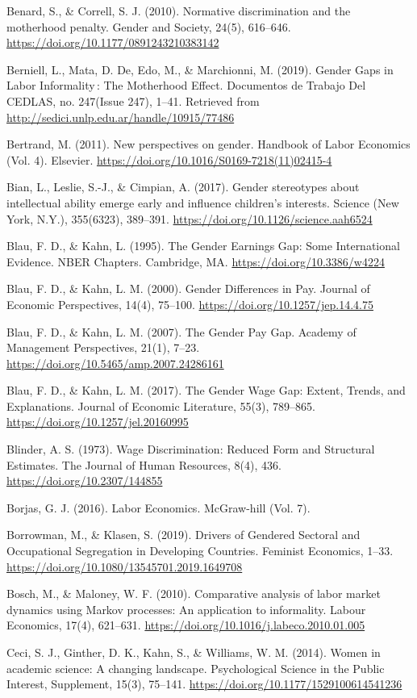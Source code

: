 Benard, S., \& Correll, S. J. (2010). Normative discrimination and the motherhood penalty. Gender and Society, 24(5), 616–646. \url{https://doi.org/10.1177/0891243210383142}

Berniell, L., Mata, D. De, Edo, M., \& Marchionni, M. (2019). Gender Gaps in Labor Informality : The Motherhood Effect. Documentos de Trabajo Del CEDLAS, no. 247(Issue 247), 1–41. Retrieved from \url{http://sedici.unlp.edu.ar/handle/10915/77486}

Bertrand, M. (2011). New perspectives on gender. Handbook of Labor Economics (Vol. 4). Elsevier. \url{https://doi.org/10.1016/S0169-7218(11)02415-4}

Bian, L., Leslie, S.-J., \& Cimpian, A. (2017). Gender stereotypes about intellectual ability emerge early and influence children's interests. Science (New York, N.Y.), 355(6323), 389–391. \url{https://doi.org/10.1126/science.aah6524}

Blau, F. D., \& Kahn, L. (1995). The Gender Earnings Gap: Some International Evidence. NBER Chapters. Cambridge, MA. \url{https://doi.org/10.3386/w4224}

Blau, F. D., \& Kahn, L. M. (2000). Gender Differences in Pay. Journal of Economic Perspectives, 14(4), 75–100. \url{https://doi.org/10.1257/jep.14.4.75}

Blau, F. D., \& Kahn, L. M. (2007). The Gender Pay Gap. Academy of Management Perspectives, 21(1), 7–23. \url{https://doi.org/10.5465/amp.2007.24286161}

Blau, F. D., \& Kahn, L. M. (2017). The Gender Wage Gap: Extent, Trends, and Explanations. Journal of Economic Literature, 55(3), 789–865. \url{https://doi.org/10.1257/jel.20160995}

Blinder, A. S. (1973). Wage Discrimination: Reduced Form and Structural Estimates. The Journal of Human Resources, 8(4), 436. \url{https://doi.org/10.2307/144855}

Borjas, G. J. (2016). Labor Economics. McGraw-hill (Vol. 7).

Borrowman, M., \& Klasen, S. (2019). Drivers of Gendered Sectoral and Occupational Segregation in Developing Countries. Feminist Economics, 1–33. \url{https://doi.org/10.1080/13545701.2019.1649708}

Bosch, M., \& Maloney, W. F. (2010). Comparative analysis of labor market dynamics using Markov processes: An application to informality. Labour Economics, 17(4), 621–631. \url{https://doi.org/10.1016/j.labeco.2010.01.005}

Ceci, S. J., Ginther, D. K., Kahn, S., \& Williams, W. M. (2014). Women in academic science: A changing landscape. Psychological Science in the Public Interest, Supplement, 15(3), 75–141. \url{https://doi.org/10.1177/1529100614541236}


